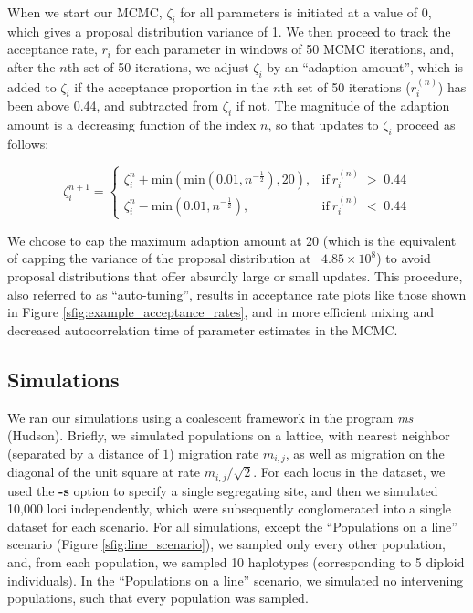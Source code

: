 \documentclass[12pt]{article}
\begin{document}
When we start our MCMC, $\zeta_i$ for all parameters is initiated at a value of 0, which gives a proposal distribution variance of 1.  We then proceed to track the acceptance rate, $r_i$ for each parameter in windows of 50 MCMC iterations, and, after the $n$th set of 50 iterations, we adjust $\zeta_i$ by an ``adaption amount'', which is added to $\zeta_i$ if the acceptance proportion in the $n$th set of 50 iterations ($r^{(n)}_i$) has been above 0.44, and subtracted from $\zeta_i$ if not.  The magnitude of the adaption amount is a decreasing function of the index $n$, so that updates to $\zeta_i$ proceed as follows:

\begin{equation}
\zeta^{n+1}_i =
\begin{cases}
\zeta^{n}_i + \text{min}(\text{min}(0.01,n^{-\frac{1}{2}}),20), & \text{if} \: r^{(n)}_i \; > \; 0.44 \\
\zeta^{n}_i - \text{min}(0.01,n^{-\frac{1}{2}}), & \text{if} \: r^{(n)}_i \; < \; 0.44
\end{cases}
\label{eq:adpative_mcmc}
\end{equation}

We choose to cap the maximum adaption amount at 20 (which is the equivalent of capping the variance of the proposal distribution at ~$4.85 \times 10^8$) to avoid proposal distributions that offer absurdly large or small updates.  This procedure, also referred to as ``auto-tuning'', results in acceptance rate plots like those shown in Figure \ref{sfig:example_acceptance_rates}, and in more efficient mixing and decreased autocorrelation time of parameter estimates in the MCMC.

\subsection*{Simulations}
We ran our simulations using a coalescent framework in the program \textit{ms} (Hudson).  Briefly, we simulated populations on a lattice, with nearest neighbor (separated by a distance of $1$) migration rate $m_{i,j}$, as well as migration on the diagonal of the unit square at rate $m_{i,j}/\sqrt{2}$.  For each locus in the dataset, we used the \textbf{-s} option to specify a single segregating site, and then we simulated 10,000 loci independently, which were subsequently conglomerated into a single dataset for each scenario.  For all simulations, except the ``Populations on a line'' scenario (Figure \ref{sfig:line_scenario}), we sampled only every other population, and, from each population, we sampled 10 haplotypes (corresponding to 5 diploid individuals).  In the ``Populations on a line'' scenario, we simulated no intervening populations, such that every population was sampled.
\end{document}
